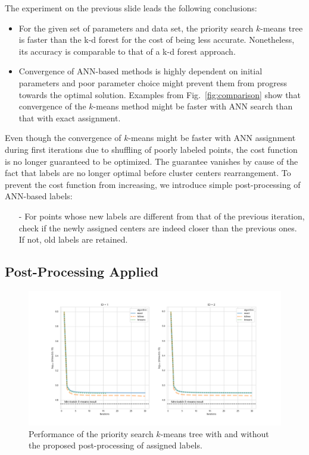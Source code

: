 \begin{frame}
	The experiment on the previous slide leads the following conclusions:
	
	\begin{itemize}
		\item For the given set of parameters and data set, the priority search $k$-means tree is faster than the k-d forest for the cost of being less accurate. Nonetheless, its accuracy is comparable to that of a k-d forest approach.
		\item Convergence of ANN-based methods is highly dependent on initial parameters and poor parameter choice might prevent them from progress towards the optimal solution. Examples from Fig.~\ref{fig:comparison} show that convergence of the $k$-means method might be faster with ANN search than that with exact assignment.
	\end{itemize}
	
	Even though the convergence of $k$-means might be faster with ANN assignment during first iterations due to shuffling of poorly labeled points, the cost function is no longer guaranteed to be optimized. The guarantee vanishes by cause of the fact that labels are no longer optimal before cluster centers rearrangement. To prevent the cost function from increasing, we introduce simple post-processing of ANN-based labels:
	
	\begin{itemize}
		\item[-] For points whose new labels are different from that of the previous iteration, check if the newly assigned centers are indeed closer than the previous ones. If not, old labels are retained. 
	\end{itemize}
\end{frame}


\subsection{Post-Processing Applied}

\begin{frame}
	
	\begin{figure}
		\centering
		\includegraphics[width=1.0\linewidth]{../images/flann/comparison}
		\caption{\footnotesize Performance of the priority search $k$-means tree with and without the proposed post-processing of assigned labels.}
		\label{fig:comparison_fix}
	\end{figure}

\end{frame}